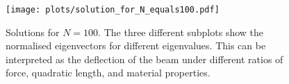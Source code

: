 \documentclass[english,notitlepage]{revtex4-1}  %
\begin{document}
\begin{figure}
    \centering
    \texttt{[image: plots/solution\_for\_N\_equals100.pdf]}
    \caption{Solutions for $N = 100$. The three different subplots show the normalised eigenvectors for different eigenvalues. This can be interpreted as the deflection of the beam under different ratios of force, quadratic length, and material properties.}
    \label{fig:solution100}
\end{figure}





\end{document}
